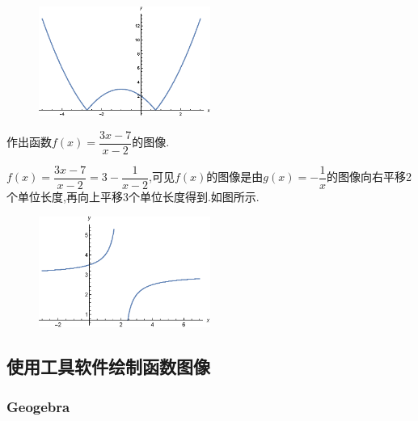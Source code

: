 \documentclass[lang=cn,math=cm,chinesefont=nofont,11pt,scheme=chinese,twocol]{elegantbook}
\begin{document}
\begin{figure}[h]
  \centering
  \includegraphics[width=0.5\textwidth]{image/2.1.5function3.eps}
  \label{img:2.1.5function3}
\end{figure}

\begin{example}
  作出函数$f(x)=\dfrac{3x-7}{x-2}$的图像.
\end{example}

\begin{spacing}{1.8}
  
\end{spacing}
\begin{solution}
  \begin{spacing}{1.8}
    $f(x)=\dfrac{3x-7}{x-2}=3-\dfrac{1}{x-2}$,可见$f(x)$的图像是由$g(x)=-\dfrac{1}{x}$的图像向右平移2个单位长度,再向上平移$3$个单位长度得到.如图所示.
  \end{spacing}
\end{solution}

\begin{figure}[h]
  \centering
  \includegraphics[width=0.5\textwidth]{image/2.1.5function4.eps}
  \label{img:2.1.5function4}
\end{figure}

\subsection{使用工具软件绘制函数图像}

\subsubsection{Geogebra}
\end{document}
